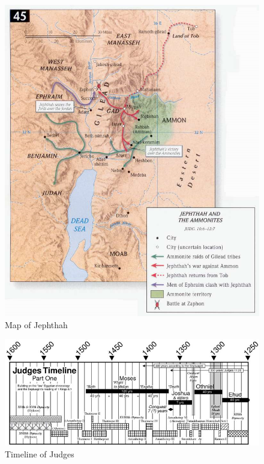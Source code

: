 \newpage
\begin{figure}
\begin{center}
\includegraphics[scale=0.6, angle=0]{07OT-Judges/References/8.Jephthah-Map}
\caption[Map of Jephthah]{Map of Jephthah}
\label{fig:Map of Jephthah}
\end{center}
\end{figure}


\newpage
\begin{figure}
\begin{center}
\includegraphics[scale=0.8, angle=90]{07OT-Judges/References/10.Timeline1-Judges}
\caption[Timeline of Judges]{Timeline of Judges}
\label{fig:Timeline of Judges}
\end{center}
\end{figure}



